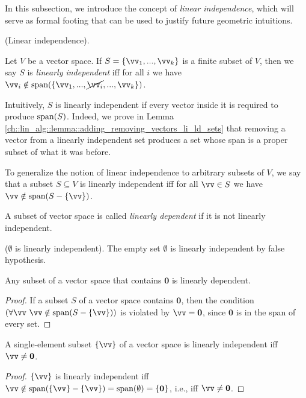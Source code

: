 In this subsection, we introduce the concept of \textit{linear independence}, which will serve as formal footing that can be used to justify future geometric intuitions.

\begin{defn}
    (Linear independence).
    
    Let $V$ be a vector space. If $S = \{\vv_1, ..., \vv_k\}$ is a finite subset of $V$, then we say $S$ is \textit{linearly independent} iff for all $i$ we have $\vv_i \notin \spann(\{\vv_1, ..., \cancel{\vv_i}, ..., \vv_k\})$.
    
    Intuitively, $S$ is linearly independent if every vector inside it is required to produce $\text{span}(S)$. Indeed, we prove in Lemma \ref{ch::lin_alg::lemma::adding_removing_vectors_li_ld_sets} that removing a vector from a linearly independent set produces a set whose span is a proper subset of what it was before.
    
    To generalize the notion of linear independence to arbitrary subsets of $V$, we say that a subset $S \subseteq V$ is linearly independent iff for all $\vv \in S$ we have $\vv \notin \spann(S - \{\vv\})$.
    
    A subset of vector space is called \textit{linearly dependent} if it is not linearly independent.
\end{defn}

\begin{remark}
    ($\emptyset$ is linearly independent). The empty set $\emptyset$ is linearly independent by false hypothesis.
\end{remark}

\begin{theorem}
    Any subset of a vector space that contains $\mathbf{0}$ is linearly dependent.
\end{theorem}

\begin{proof}
    If a subset $S$ of a vector space contains $\mathbf{0}$, then the condition $(\forall \vv \spc \vv \notin \spann(S - \{\vv\}))$ is violated by $\vv = \mathbf{0}$, since $\mathbf{0}$ is in the span of every set.
\end{proof}

\begin{theorem}
    A single-element subset $\{\vv\}$ of a vector space is linearly independent iff $\vv \neq \mathbf{0}$.
\end{theorem}

\begin{proof}
   $\{\vv\}$ is linearly independent iff $\vv \notin \spann(\{\vv\} - \{\vv\}) = \spann(\emptyset) = \{\mathbf{0}\}$, i.e., iff $\vv \neq \mathbf{0}$.
\end{proof}

